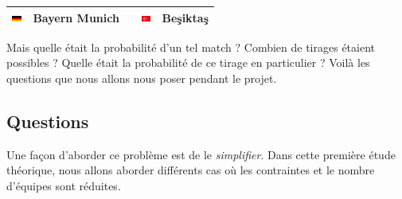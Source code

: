 \documentclass{../ficheTDTP}
\begin{document}
\begin{tabular}{|clccl|}
\includegraphics[height=0.2cm]{flags/de.png} & Bayern Munich & & \includegraphics[height=0.2cm]{flags/tr.png} & Beşiktaş \\ \hline
\end{tabular}

\vspace{0.5cm}

Mais quelle était la probabilité d'un tel match ? Combien de tirages étaient possibles ? Quelle était la probabilité de ce tirage en particulier ? Voilà les questions que nous allons nous poser pendant le projet.

\subsection{Questions}

Une façon d'aborder ce problème est de le \textit{simplifier}. Dans cette première étude théorique, nous allons aborder différents cas où les contraintes et le nombre d'équipes sont réduites.
\end{document}
